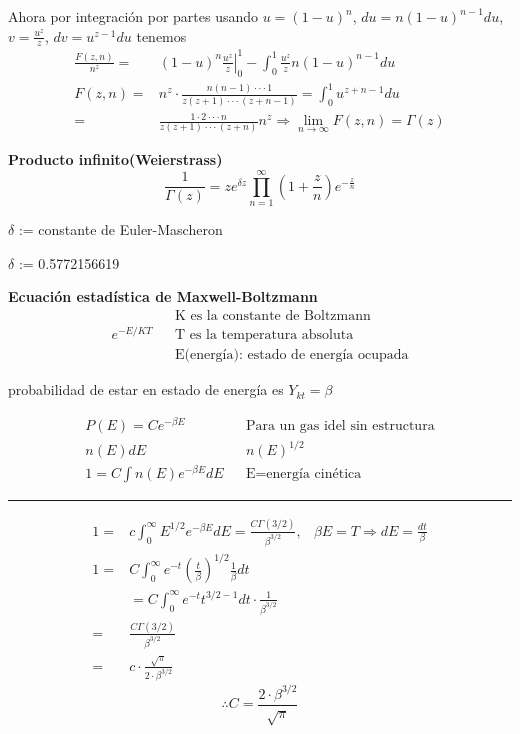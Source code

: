 \documentclass{article}
\theoremstyle{definition}
\begin{document}
Ahora por integración por partes usando $u=(1-u)^n$, $du=n(1-u)^{n-1}du$, $v=\frac{u^z}{z}$, $dv=u^{z-1}du$ tenemos
\[
\begin{array}{rl}
	\frac{F(z,n)}{n^z}=& (1-u)^n \left.\frac{u^z}{z}\right|^1_0-\int^1_0\frac{u^z}{z} n(1-u)^{n-1}du\\
	F(z,n)=& n^z\cdot \frac{n(n-1)\cdot\cdot\cdot 1}{z(z+1)\cdot\cdot\cdot (z+n-1)}=\int^1_0u^{z+n-1}du\\
	=& \frac{1\cdot 2\cdot\cdot\cdot n}{z(z+1)\cdot\cdot\cdot (z+n)}n^z\Rightarrow\lim\limits_{n\to \infty}F(z,n)=\Gamma (z)
\end{array}\]

\textbf{Producto infinito(Weierstrass)}
\[\frac{1}{\Gamma (z)}= z e^{\delta z} \prod^{\infty}_{n=1}\left(1+\frac{z}{n}\right)e^{-\frac{z}{n}}\]
\begin{center}
	$\delta$ := constante de Euler-Mascheron
	
	$\delta$ := 0.5772156619
\end{center}

\textbf{Ecuación estadística de Maxwell-Boltzmann}
\[\begin{array}{lcl}
	&& \text{K es la constante de Boltzmann}\\
	e^{-E/KT} && \text{T es la temperatura absoluta}\\
	&& \text{E(energía): estado de energía ocupada}

\end{array}\]

probabilidad de estar en estado de energía es $Y_{kt}=\beta$

\[\begin{array}{lcl}
	P(E)=Ce^{-\beta E} && \text{Para un gas idel sin estructura}\\
	n(E)dE && n(E)^{1/2}\\
	1=C\int n(E) e^{-\beta E}dE && \text{E=energía cinética}
\end{array}\]
\par\noindent\rule{\textwidth}{0.5pt}
\[
\begin{array}{rlr}
	1=& c\int^{\infty}_0 E^{1/2}e^{-\beta E}dE=\frac{C\Gamma (3/2)}{\beta^{3/2}},& \beta E = T\Rightarrow dE=\frac{dt}{\beta}\\
	1=& C\int^{\infty}_0 e^{-t}\left(\frac{t}{\beta}\right)^{1/2}\frac{1}{\beta} dt\\
	&= C \int^{\infty}_0 e^{-t} t^{3/2-1}dt\cdot\frac{1}{\beta^{3/2}}\\
	=& \frac{C\Gamma (3/2)}{\beta^{3/2}}\\
	=& c\cdot\frac{\sqrt{\pi}}{2\cdot\beta^{3/2}}
\end{array}\]
\[\therefore C= \frac{2\cdot \beta^{3/2}}{\sqrt{\pi}}\]
\newpage
\end{document}
